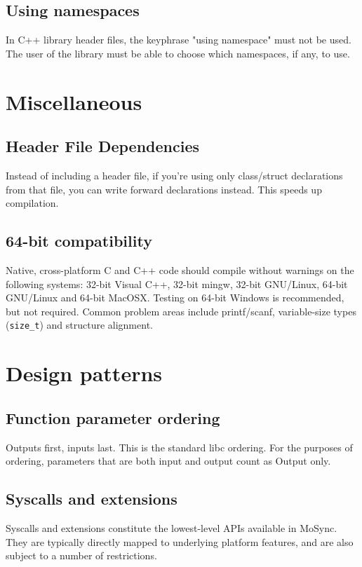 \documentclass {article}
\begin{document}
\subsection{Using namespaces}

In C++ library header files, the keyphrase "using namespace" must not be used. The user of the library must be able to choose which namespaces, if any, to use.


\section{Miscellaneous}
\subsection{Header File Dependencies}
Instead of including a header file, if you're using only class/struct declarations from that file, you can write forward declarations instead. This speeds up compilation.

\subsection{64-bit compatibility}
Native, cross-platform C and C++ code should compile without warnings on the following systems:
32-bit Visual C++, 32-bit mingw, 32-bit GNU/Linux, 64-bit GNU/Linux and 64-bit MacOSX.
Testing on 64-bit Windows is recommended, but not required.
Common problem areas include printf/scanf, variable-size types (\verb|size_t|) and structure alignment.


\section{Design patterns}
\subsection{Function parameter ordering}
Outputs first, inputs last. This is the standard libc ordering.
For the purposes of ordering, parameters that are both input and output count as Output only.

\subsection{Syscalls and extensions}
Syscalls and extensions constitute the lowest-level APIs available in MoSync. They are typically directly mapped to underlying platform features, and are also subject to a number of restrictions. 
\end{document}
